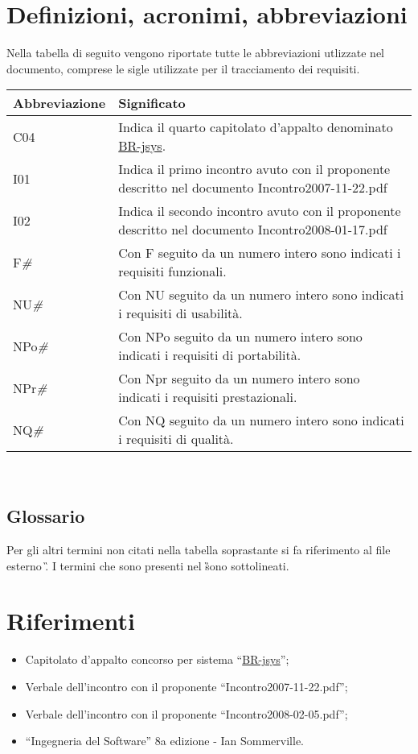 \section{Definizioni, acronimi, abbreviazioni}
Nella tabella di seguito vengono riportate tutte le abbreviazioni utlizzate nel documento, comprese le sigle utilizzate per il tracciamento dei requisiti.
\begin{center}
\begin{tabular}{||p{3.0cm}||p{8.5cm}||} \hline
\textbf{Abbreviazione} & \textbf{Significato} \\ \hline
C04 & Indica il quarto capitolato d'appalto denominato \underline{BR-jsys}.\\ \hline
I01 & Indica il primo incontro avuto con il proponente descritto nel documento Incontro2007-11-22.pdf\\ \hline
I02 & Indica il secondo incontro avuto con il proponente descritto nel documento Incontro2008-01-17.pdf\\ \hline
F\textit{\#} & Con F seguito da un numero intero sono indicati i requisiti funzionali.\\ \hline
NU\textit{\#} & Con NU seguito da un numero intero sono indicati i requisiti di usabilit\`a.\\ \hline
NPo\textit{\#} & Con NPo seguito da un numero intero sono indicati i requisiti di portabilit\`a.\\ \hline
NPr\textit{\#} & Con Npr seguito da un numero intero sono indicati i requisiti prestazionali.\\ \hline
NQ\textit{\#} & Con NQ seguito da un numero intero sono indicati i requisiti di qualit\`a.\\ \hline

\end{tabular} \\
\end{center}
\subsection{Glossario}
Per gli altri termini non citati nella tabella soprastante si fa riferimento al file esterno \G. I termini che sono presenti nel \G sono sottolineati.
\section{Riferimenti}
\begin{itemize}
\item Capitolato d'appalto concorso per sistema ``\underline{BR-jsys}'';
\item Verbale dell'incontro con il proponente ``Incontro2007-11-22.pdf'';
\item Verbale dell'incontro con il proponente ``Incontro2008-02-05.pdf'';
\item ``Ingegneria del Software'' 8a edizione - Ian Sommerville.
\end{itemize}
